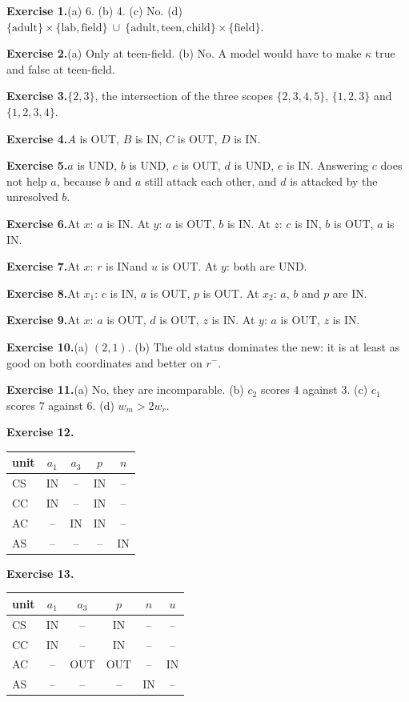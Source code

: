 \documentclass[11pt]{article}
\newcommand{\IN}{\textsf{IN}}
\newcommand{\OUT}{\textsf{OUT}}
\newcommand{\UND}{\textsf{UND}}
\newcounter{ex}
\newcommand{\Key}[2]{\par\noindent\textbf{#1.}\enspace #2\par}
\begin{document}
\Key{Exercise 1}{(a) 6. (b) 4. (c) No. (d) $\{\text{adult}\}\times\{\text{lab},\text{field}\}\ \cup\ \{\text{adult},\text{teen},\text{child}\}\times\{\text{field}\}$.}
\Key{Exercise 2}{(a) Only at teen-field. (b) No. A model would have to make $\kappa$ true and false at teen-field.}
\Key{Exercise 3}{$\{2,3\}$, the intersection of the three scopes $\{2,3,4,5\}$, $\{1,2,3\}$ and $\{1,2,3,4\}$.}
\Key{Exercise 4}{$A$ is \OUT, $B$ is \IN, $C$ is \OUT, $D$ is \IN.}
\Key{Exercise 5}{$a$ is \UND, $b$ is \UND, $c$ is \OUT, $d$ is \UND, $e$ is \IN. Answering $c$ does not help $a$, because $b$ and $a$ still attack each other, and $d$ is attacked by the unresolved $b$.}
\Key{Exercise 6}{At $x$: $a$ is \IN. At $y$: $a$ is \OUT, $b$ is \IN. At $z$: $c$ is \IN, $b$ is \OUT, $a$ is \IN.}
\Key{Exercise 7}{At $x$: $r$ is \IN and $u$ is \OUT. At $y$: both are \UND.}
\Key{Exercise 8}{At $x_1$: $c$ is \IN, $a$ is \OUT, $p$ is \OUT. At $x_2$: $a$, $b$ and $p$ are \IN.}
\Key{Exercise 9}{At $x$: $a$ is \OUT, $d$ is \OUT, $z$ is \IN. At $y$: $a$ is \OUT, $z$ is \IN.}
\Key{Exercise 10}{(a) $(2,1)$. (b) The old status dominates the new: it is at least as good on both coordinates and better on $r^-$.}
\Key{Exercise 11}{(a) No, they are incomparable. (b) $c_2$ scores $4$ against $3$. (c) $c_1$ scores $7$ against $6$. (d) $w_m>2w_r$.}
\Key{Exercise 12}{\par\smallskip\noindent \begin{tabular}{@{}lcccc@{}}\toprule
unit & $a_1$ & $a_3$ & $p$ & $n$ \\\midrule
CS & \textsf{IN} & -- & \textsf{IN} & -- \\
CC & \textsf{IN} & -- & \textsf{IN} & -- \\
AC & -- & \textsf{IN} & \textsf{IN} & -- \\
AS & -- & -- & -- & \textsf{IN} \\
\bottomrule\end{tabular}}
\Key{Exercise 13}{\par\smallskip\noindent \begin{tabular}{@{}lccccc@{}}\toprule
unit & $a_1$ & $a_3$ & $p$ & $n$ & $u$ \\\midrule
CS & \textsf{IN} & -- & \textsf{IN} & -- & -- \\
CC & \textsf{IN} & -- & \textsf{IN} & -- & -- \\
AC & -- & \textsf{OUT} & \textsf{OUT} & -- & \textsf{IN} \\
AS & -- & -- & -- & \textsf{IN} & -- \\
\bottomrule\end{tabular}}
\end{document}
